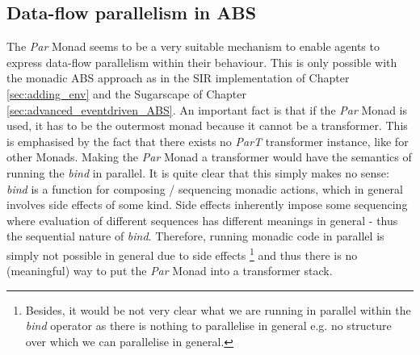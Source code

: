 \subsection{Data-flow parallelism in ABS}
The \textit{Par} Monad seems to be a very suitable mechanism to enable agents to express data-flow parallelism within their behaviour. This is only possible with the monadic ABS approach as in the SIR implementation of Chapter \ref{sec:adding_env} and the Sugarscape of Chapter \ref{sec:advanced_eventdriven_ABS}. An important fact is that if the \textit{Par} Monad is used, it has to be the outermost monad because it cannot be a transformer. This is emphasised by the fact that there exists no \textit{ParT} transformer instance, like for other Monads. Making the \textit{Par} Monad a transformer would have the semantics of running the \textit{bind} in parallel. It is quite clear that this simply makes no sense: \textit{bind} is a function for composing / sequencing monadic actions, which in general involves side effects of some kind. Side effects inherently impose some sequencing where evaluation of different sequences has different meanings in general - thus the sequential nature of \textit{bind}. Therefore, running monadic code in parallel is simply not possible in general due to side effects \footnote{Besides, it would be not very clear what we are running in parallel within the \textit{bind} operator as there is nothing to parallelise in general e.g. no structure over which we can parallelise in general.} and thus there is no (meaningful) way to put the \textit{Par} Monad into a transformer stack.